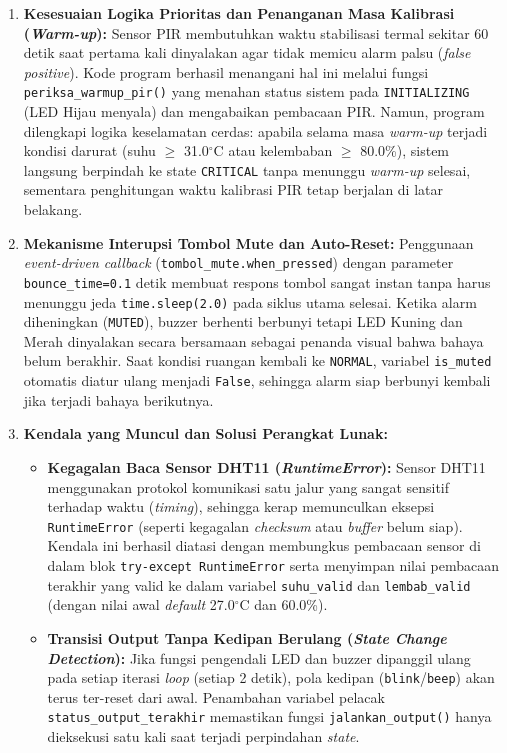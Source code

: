 \documentclass[12pt, a4paper]{article}
\begin{document}
\begin{enumerate}
    \item \textbf{Kesesuaian Logika Prioritas dan Penanganan Masa Kalibrasi (\textit{Warm-up}):}
    Sensor PIR membutuhkan waktu stabilisasi termal sekitar 60 detik saat pertama kali dinyalakan agar tidak memicu alarm palsu 
    (\textit{false positive}). Kode program berhasil menangani hal ini melalui fungsi \texttt{periksa\_warmup\_pir()} yang menahan
     status sistem pada \texttt{INITIALIZING} (LED Hijau menyala) dan mengabaikan pembacaan PIR. Namun, program dilengkapi logika
      keselamatan cerdas: apabila selama masa \textit{warm-up} terjadi kondisi darurat (suhu $\ge$ 31.0$^\circ$C atau kelembaban 
      $\ge$ 80.0\%), sistem langsung berpindah ke state \texttt{CRITICAL} tanpa menunggu \textit{warm-up} selesai, sementara penghitungan waktu kalibrasi PIR tetap berjalan di latar belakang.
    
    \item \textbf{Mekanisme Interupsi Tombol Mute dan Auto-Reset:}
    Penggunaan \textit{event-driven callback} (\texttt{tombol\_mute.when\_pressed}) dengan parameter \texttt{bounce\_time=0.1} 
    detik membuat respons tombol sangat instan tanpa harus menunggu jeda \texttt{time.sleep(2.0)} pada siklus utama selesai. 
    Ketika alarm diheningkan (\texttt{MUTED}), buzzer berhenti berbunyi tetapi LED Kuning dan Merah dinyalakan secara bersamaan 
    sebagai penanda visual bahwa bahaya belum berakhir. Saat kondisi ruangan kembali ke \texttt{NORMAL}, variabel 
    \texttt{is\_muted} otomatis diatur ulang menjadi \texttt{False}, sehingga alarm siap berbunyi kembali jika terjadi 
    bahaya berikutnya.

    \item \textbf{Kendala yang Muncul dan Solusi Perangkat Lunak:}
    \begin{itemize}
        \item \textbf{Kegagalan Baca Sensor DHT11 (\textit{RuntimeError}):} Sensor DHT11 menggunakan protokol komunikasi satu 
        jalur yang sangat sensitif terhadap waktu (\textit{timing}), sehingga kerap memunculkan eksepsi \texttt{RuntimeError} 
        (seperti kegagalan \textit{checksum} atau \textit{buffer} belum siap). Kendala ini berhasil diatasi dengan membungkus 
        pembacaan sensor di dalam blok \texttt{try-except RuntimeError} serta menyimpan nilai pembacaan terakhir yang valid ke 
        dalam variabel \texttt{suhu\_valid} dan \texttt{lembab\_valid} (dengan nilai awal \textit{default} 27.0$^\circ$C dan 60.0\%).
        \item \textbf{Transisi Output Tanpa Kedipan Berulang (\textit{State Change Detection}):} Jika fungsi pengendali LED dan 
        buzzer dipanggil ulang pada setiap iterasi \textit{loop} (setiap 2 detik), pola kedipan (\texttt{blink}/\texttt{beep}) 
        akan terus ter-reset dari awal. Penambahan variabel pelacak \texttt{status\_output\_terakhir} memastikan fungsi 
        \texttt{jalankan\_output()} hanya dieksekusi satu kali saat terjadi perpindahan \textit{state}.
    \end{itemize}
\end{enumerate}
\end{document}
